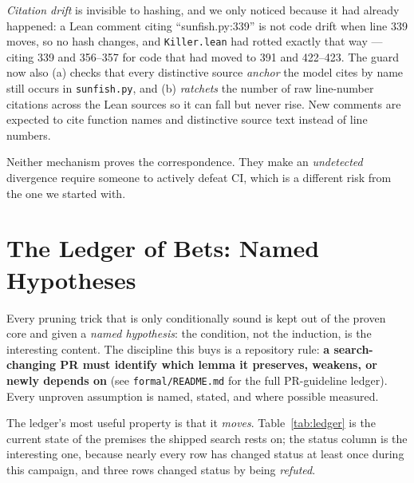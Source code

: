 \documentclass[11pt]{article}
\theoremstyle{plain}
\theoremstyle{definition}
\theoremstyle{remark}
\begin{document}
\emph{Citation drift} is invisible to hashing, and we only noticed
because it had already happened: a Lean comment citing
``sunfish.py:339'' is not code drift when line 339 moves, so no hash
changes, and \texttt{Killer.lean} had rotted exactly that way ---
citing 339 and 356--357 for code that had moved to 391 and 422--423.
The guard now also (a) checks that every distinctive source
\emph{anchor} the model cites by name still occurs in
\texttt{sunfish.py}, and (b) \emph{ratchets} the number of raw
line-number citations across the Lean sources so it can fall but never
rise.  New comments are expected to cite function names and distinctive
source text instead of line numbers.

Neither mechanism proves the correspondence.  They make an
\emph{undetected} divergence require someone to actively defeat CI,
which is a different risk from the one we started with.

\section{The Ledger of Bets: Named Hypotheses}
\label{sec:ledger}

Every pruning trick that is only conditionally sound is kept out of the
proven core and given a \emph{named hypothesis}: the condition, not the
induction, is the interesting content.  The discipline this buys is a
repository rule: \textbf{a search-changing PR must identify which lemma
it preserves, weakens, or newly depends on} (see
\texttt{formal/README.md} for the full PR-guideline ledger).  Every
unproven assumption is named, stated, and where possible measured.

The ledger's most useful property is that it \emph{moves}.
Table~\ref{tab:ledger} is the current state of the premises the shipped
search rests on; the status column is the interesting one, because
nearly every row has changed status at least once during this campaign,
and three rows changed status by being \emph{refuted}.
\end{document}
